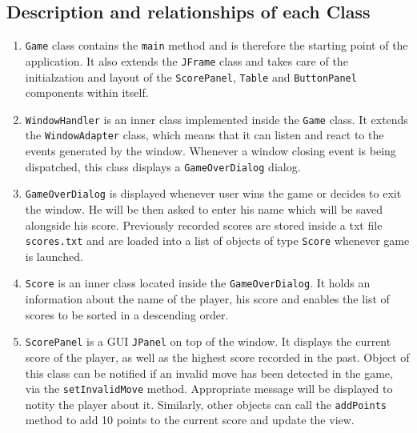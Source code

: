 \documentclass[a4paper, 12pt, titlepage]{article}
\begin{document}
\subsection{Description and relationships of each Class}
\begin{enumerate}
	\item \texttt{Game} class contains the \texttt{main} method and is therefore the 
		starting point of the application. It also extends the \texttt{JFrame} class and 
		takes care of the initialzation and layout of the \texttt{ScorePanel}, 
		\texttt{Table} and \texttt{ButtonPanel} components within itself.
		
	\item \texttt{WindowHandler} is an inner class implemented inside the \texttt{Game}
		class. It extends the \texttt{WindowAdapter} class, which means that it can 
		listen and react to the events generated by the window. Whenever a window closing 
		event is being dispatched, this class displays a \texttt{GameOverDialog} dialog.
		
	\item \texttt{GameOverDialog} is displayed whenever user wins the game or decides to
		exit the window. He will be then asked to enter his name which will be saved
		alongside his score. Previously recorded scores are stored inside a txt file
		\texttt{scores.txt} and are loaded into a list of objects of type \texttt{Score}
		whenever game is launched.
		
	\item \texttt{Score} is an inner class located inside the \texttt{GameOverDialog}. 
		It holds an information about the name of the player, his score and enables the
		list of scores to be sorted in a descending order. 
		
		
		
	\item \texttt{ScorePanel} is a GUI \texttt{JPanel} on top of the window. It displays
		the current score of the player, as well as the highest score recorded in the 
		past. Object of this class can be notified if an invalid move has been detected 
		in the game, via the \texttt{setInvalidMove} method. Appropriate message will be 
		displayed to notity the player about it. Similarly, other objects can call 
		the \texttt{addPoints} method to add 10 points to the current score and update
		the view.
		

\end{enumerate}
\end{document}
